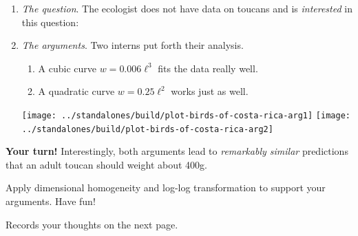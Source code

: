 \documentclass[../main.tex]{subfiles}
\begin{document}
\begin{example}
\begin{enumerate}[wide, label=(\arabic*)]
    \item \emph{The question}. The ecologist does not have data on toucans and is \emph{interested} in this question:
      \begin{center}
      \end{center}

    \item \emph{The arguments}. Two interns put forth their analysis. 
      \begin{enumerate}[wide, label=Intern \Alph*:]
        \item A cubic curve \(w = 0.006 \ell^{3}\) fits the data really well.
        \item A quadratic curve \(w = 0.25 \ell^{2}\) works just as well.
      \end{enumerate}

      \texttt{[image: ../standalones/build/plot-birds-of-costa-rica-arg1]}
      \texttt{[image: ../standalones/build/plot-birds-of-costa-rica-arg2]}
  \end{enumerate}

  \medskip
  \begin{mdframed}[roundcorner=10pt]
    \textbf{Your turn!} Interestingly, both arguments lead to \emph{remarkably similar} predictions that an adult toucan should weight about 400g. 
    \begin{center}
    \end{center}

    Apply dimensional homogeneity and log-log transformation to support your arguments. Have fun!
  \end{mdframed}

  Records your thoughts on the next page. 

\end{example}
\end{document}
